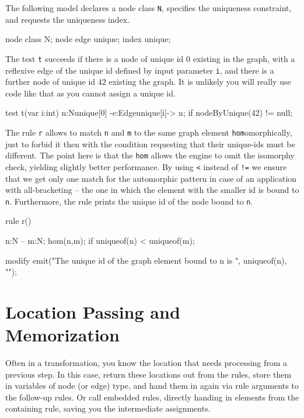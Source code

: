 \begin{example}

The following model declares a node class \texttt{N}, specifies the uniqueness constraint, and requests the uniqueness index.
 
\begin{grgen}
node class N;
node edge unique;
index unique;
\end{grgen}

The test \texttt{t} succeeds if there is a node of unique id $0$ existing in the graph, with a reflexive edge of the unique id defined by input parameter \texttt{i}, and there is a further node of unique id $42$ existing the graph. It is unlikely you will really use code like that as you cannot assign a unique id.

\begin{grgen}
test t(var i:int) {
  n:N{unique[0]} -e:Edge{unique[i]}-> n;
  if{ nodeByUnique(42) != null; }
}
\end{grgen}

The rule \texttt{r} allows to match \texttt{n} and \texttt{m} to the same graph element \texttt{hom}omorphically, just to forbid it then with the condition requesting that their unique-ids must be different. The point here is that the \texttt{hom} allows the engine to omit the isomorphy check, yielding slightly better performance. By using \verb#<# instead of \verb#!=# we ensure that we get only one match for the automorphic pattern in case of an application with all-bracketing -- the one in which the element with the smaller id is bound to \texttt{n}. Furthermore, the rule prints the unique id of the node bound to \texttt{n}.

\begin{grgen}
rule r() {
  n:N -- m:N;
  hom(n,m);
  if{ uniqueof(n) < uniqueof(m); }
		
  modify {
    emit("The unique id of the graph element bound to n is ", uniqueof(n), "\n");
  }
}
\end{grgen}

\end{example}



\section{Location Passing and Memorization}
Often in a transformation, you know the location that needs processing from a previous step.
In this case, return these locations out from the rules, store them in variables of node (or edge) type, and hand them in again via rule arguments to the follow-up rules.
Or call embedded rules, directly handing in elements from the containing rule, saving you the intermediate assignments.

